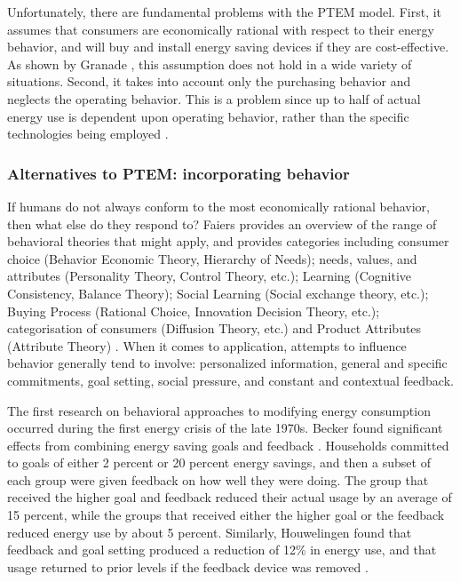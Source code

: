 Unfortunately, there are fundamental problems with the PTEM model. First,
it assumes that consumers are economically rational with respect to their
energy behavior, and will buy and install energy saving devices if they are
cost-effective. As shown by Granade \cite{Granade09}, this assumption does
not hold in a wide variety of situations.  Second, it takes into account
only the purchasing behavior and neglects the operating behavior.  This is
a problem since up to half of actual energy use is dependent upon operating
behavior, rather than the specific technologies being employed
\cite{Frank09}.

\subsubsection{Alternatives to PTEM: incorporating behavior}

If humans do not always conform to the most economically rational behavior,
then what else do they respond to?  Faiers provides an overview of the
range of behavioral theories that might apply, and provides categories
including consumer choice (Behavior Economic Theory, Hierarchy of Needs);
needs, values, and attributes (Personality Theory, Control Theory, etc.);
Learning (Cognitive Consistency, Balance Theory); Social Learning (Social
exchange theory, etc.); Buying Process (Rational Choice, Innovation
Decision Theory, etc.); categorisation of consumers (Diffusion Theory,
etc.) and Product Attributes (Attribute Theory) \cite{Faiers07}. When it
comes to application, attempts to influence behavior generally tend to
involve: personalized information, general and specific commitments, goal
setting, social pressure, and constant and contextual feedback.

The first research on behavioral approaches to modifying energy consumption
occurred during the first energy crisis of the late 1970s. Becker found
significant effects from combining energy saving goals and feedback
\cite{Becker78} .  Households committed to goals of either 2 percent or 20
percent energy savings, and then a subset of each group were given feedback
on how well they were doing. The group that received the higher goal and
feedback reduced their actual usage by an average of 15 percent, while the
groups that received either the higher goal or the feedback reduced energy
use by about 5 percent.  Similarly, Houwelingen found that feedback and
goal setting produced a reduction of 12\% in energy use, and that usage
returned to prior levels if the feedback device was removed
\cite{Houwelingen89}.


